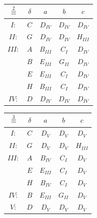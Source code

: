\documentclass[a4paper,11pt]{article}[24.3.2010]
\begin{document}
\begin{enumerate}
\begin{enumerate}
\begin{itemize}
        \begin{table}[ht]
        \begin{center}
        \begin{tabular}{ c  c | c  c  c } 
        $\overset{2}{\equiv}$ & $\delta$ & $a$ & $b$ & $c$ \\ 
        \hline
        $I:$ & $C$ & $D_{IV}$ & $D_{IV}$ & $D_{IV}$ \\ 
        \hline
        $II:$ & $G$ & $D_{IV}$ & $D_{IV}$ & $H_{III}$ \\ 
        \hline
        $III:$ & $A$ & $B_{III}$ & $C_{I}$ & $D_{IV}$ \\ 
        & $B$ & $E_{III}$ & $G_{II}$ & $D_{IV}$ \\
        & $E$ & $E_{III}$ & $C_{I}$ & $D_{IV}$ \\
        & $H$ & $B_{III}$ & $C_{I}$ & $D_{IV}$ \\
        \hline
        $IV:$ & $D$ & $D_{IV}$ & $D_{IV}$ & $D_{IV}$ \\
        \end{tabular}
        \quad
        \begin{tabular}{ c  c | c  c  c } 
        $\overset{3}{\equiv}$ & $\delta$ & $a$ & $b$ & $c$ \\ 
        \hline
        $I:$ & $C$ & $D_{V}$ & $D_{V}$ & $D_{V}$ \\ 
        \hline
        $II:$ & $G$ & $D_{V}$ & $D_{V}$ & $H_{III}$ \\ 
        \hline
        $III:$ & $A$ & $B_{IV}$ & $C_{I}$ & $D_{V}$ \\ 
        & $E$ & $E_{III}$ & $C_{I}$ & $D_{V}$ \\
        & $H$ & $B_{IV}$ & $C_{I}$ & $D_{V}$ \\
        \hline
        $IV:$ & $B$ & $E_{III}$ & $G_{II}$ & $D_{V}$ \\
        \hline
        $V:$ & $D$ & $D_{V}$ & $D_{V}$ & $D_{V}$ \\
        \end{tabular}
        \end{center}
        \end{table}



\end{itemize}
\end{enumerate}
\end{enumerate}
\end{document}
